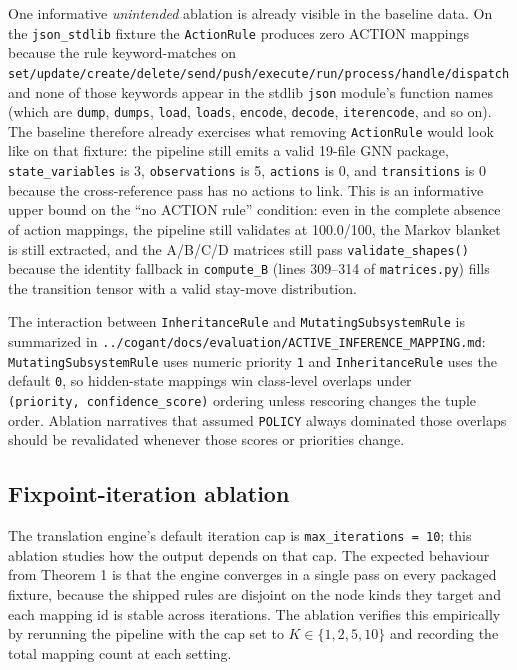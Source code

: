 \documentclass[
]{article}
\newcounter{none} %
\begin{document}
One informative \emph{unintended} ablation is already visible in the
baseline data. On the \texttt{json\_stdlib} fixture the
\texttt{ActionRule} produces zero ACTION mappings because the rule
keyword-matches on
\texttt{set/update/create/delete/send/push/execute/run/process/handle/dispatch}
and none of those keywords appear in the stdlib \texttt{json} module's
function names (which are \texttt{dump}, \texttt{dumps}, \texttt{load},
\texttt{loads}, \texttt{encode}, \texttt{decode}, \texttt{iterencode},
and so on). The baseline therefore already exercises what removing
\texttt{ActionRule} would look like on that fixture: the pipeline still
emits a valid 19-file GNN package, \texttt{state\_variables} is 3,
\texttt{observations} is 5, \texttt{actions} is 0, and
\texttt{transitions} is 0 because the cross-reference pass has no
actions to link. This is an informative upper bound on the ``no ACTION
rule'' condition: even in the complete absence of action mappings, the
pipeline still validates at 100.0/100, the Markov blanket is still
extracted, and the A/B/C/D matrices still pass
\texttt{validate\_shapes()} because the identity fallback in
\texttt{compute\_B} (lines 309--314 of \texttt{matrices.py}) fills the
transition tensor with a valid stay-move distribution.

The interaction between \texttt{InheritanceRule} and
\texttt{MutatingSubsystemRule} is summarized in
\texttt{../cogant/docs/evaluation/ACTIVE\_INFERENCE\_MAPPING.md}:
\texttt{MutatingSubsystemRule} uses numeric priority \texttt{1} and
\texttt{InheritanceRule} uses the default \texttt{0}, so hidden-state
mappings win class-level overlaps under
\texttt{(priority,\ confidence\_score)} ordering unless rescoring
changes the tuple order. Ablation narratives that assumed
\texttt{POLICY} always dominated those overlaps should be revalidated
whenever those scores or priorities change.

\subsection{Fixpoint-iteration
ablation}\label{fixpoint-iteration-ablation}

The translation engine's default iteration cap is
\texttt{max\_iterations\ =\ 10}; this ablation studies how the output
depends on that cap. The expected behaviour from Theorem 1 is that the
engine converges in a single pass on every packaged fixture, because the
shipped rules are disjoint on the node kinds they target and each
mapping id is stable across iterations. The ablation verifies this
empirically by rerunning the pipeline with the cap set to
\(K \in \{1, 2, 5, 10\}\) and recording the total mapping count at each
setting.
\end{document}
